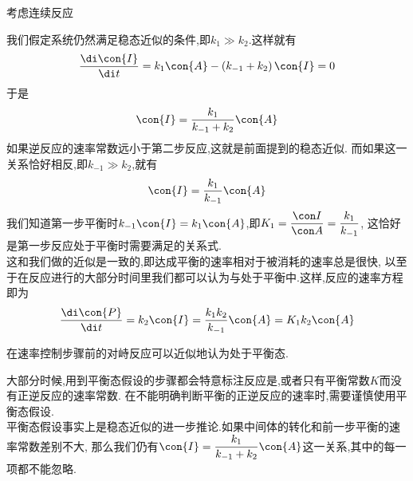 \documentclass{ctexart}
\begin{document}
\begin{derivation}
    考虑连续反应
    \begin{tightcenter}
    \end{tightcenter}
    我们假定系统仍然满足稳态近似的条件,即$k_1\gg k_2$.这样就有
    \[\dfrac{\di\con{I}}{\di t}=k_1\con{A}-\left(k_{-1}+k_2\right)\con{I}=0\]
    于是
    \[\con{I}=\dfrac{k_1}{k_{-1}+k_2}\con{A}\]
    如果逆反应的速率常数远小于第二步反应,这就是前面提到的稳态近似.%
    而如果这一关系恰好相反,即$k_{-1}\gg k_2$,就有
    \[\con{I}=\dfrac{k_1}{k_{-1}}\con{A}\]
    我们知道第一步平衡时$k_{-1}\con{I}=k_1\con{A}$,即$K_1=\dfrac{\con I}{\con A}=\dfrac{k_1}{k_{-1}}$,%
    这恰好是第一步反应处于平衡时需要满足的关系式.\\
    这和我们做的近似是一致的,即达成平衡的速率相对于被消耗的速率总是很快,%
    以至于在反应进行的大部分时间里我们都可以认为与处于平衡中.这样,反应的速率方程即为
    \[\dfrac{\di\con{P}}{\di t}=k_2\con{I}=\dfrac{k_1k_2}{k_{-1}}\con{A}=K_1k_2\con{A}\]

\end{derivation}
\begin{theorem}[7C.2.4 平衡态假设]
    在速率控制步骤前的对峙反应可以近似地认为处于平衡态.
\end{theorem}
大部分时候,用到平衡态假设的步骤都会特意标注反应是,或者只有平衡常数$K$而没有正逆反应的速率常数.%
在不能明确判断平衡的正逆反应的速率时,需要谨慎使用平衡态假设.\\
\indent 平衡态假设事实上是稳态近似的进一步推论.如果中间体的转化和前一步平衡的速率常数差别不大,%
那么我们仍有$\con{I}=\dfrac{k_1}{k_{-1}+k_2}\con{A}$这一关系,其中的每一项都不能忽略.
\end{document}
